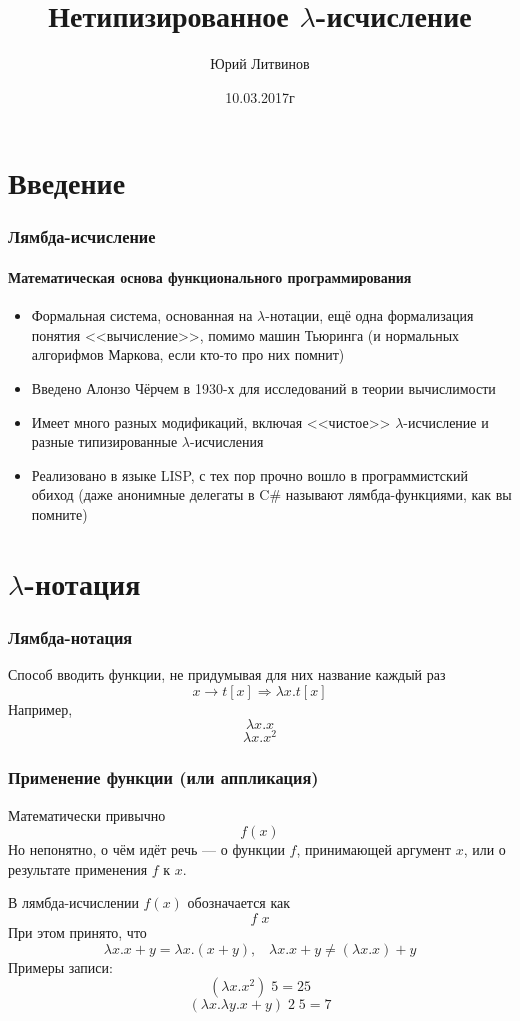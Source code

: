 \documentclass[xetex,mathserif,serif]{beamer}
\title{Нетипизированное $\lambda$-исчисление}
\author{Юрий Литвинов}
\date{10.03.2017г}
\begin{document}
	
	\frame{\titlepage}

	\section{Введение}
	
	\begin{frame}
		\frametitle{Лямбда-исчисление}
		\framesubtitle{Математическая основа функционального программирования}
		\begin{itemize}
			\item Формальная система, основанная на $\lambda$-нотации, ещё одна формализация
					понятия <<вычисление>>, помимо машин Тьюринга (и нормальных алгорифмов
					Маркова, если кто-то про них помнит)
			\item Введено Алонзо Чёрчем в 1930-х для исследований в теории вычислимости
			\item Имеет много разных модификаций, включая <<чистое>> $\lambda$-исчисление и
					разные типизированные $\lambda$-исчисления
			\item Реализовано в языке LISP, с тех пор прочно вошло в программистский обиход
					(даже анонимные делегаты в C\# называют лямбда-функциями, как вы помните)
		\end{itemize}
	\end{frame}
		
	\section{$\lambda$-нотация}
		
	\begin{frame}
		\frametitle{Лямбда-нотация}
		Способ вводить функции, не придумывая для них название каждый раз
		$$x \rightarrow t[x] \Longrightarrow \lambda x.t[x]$$
		Например,
		$$\lambda x.x$$
		$$\lambda x.x^2$$
	\end{frame}

	\begin{frame}
		\frametitle{Применение функции (или аппликация)}
		Математически привычно
		$$f(x)$$
		Но непонятно, о чём идёт речь --- о функции $f$, принимающей аргумент $x$, или о результате применения
		$f$ к $x$. 

		В лямбда-исчислении $f(x)$ обозначается как
		$$f \; x$$
		При этом принято, что
		$$\lambda x. x + y = \lambda x.(x + y), \;\;\; 
		\lambda x. x + y \neq (\lambda x.x) + y$$
		Примеры записи:
		$$(\lambda x.x^2) \; 5 = 25$$
		$$(\lambda x.\lambda y.x + y) \; 2 \; 5 = 7$$
	\end{frame}
\end{document}
